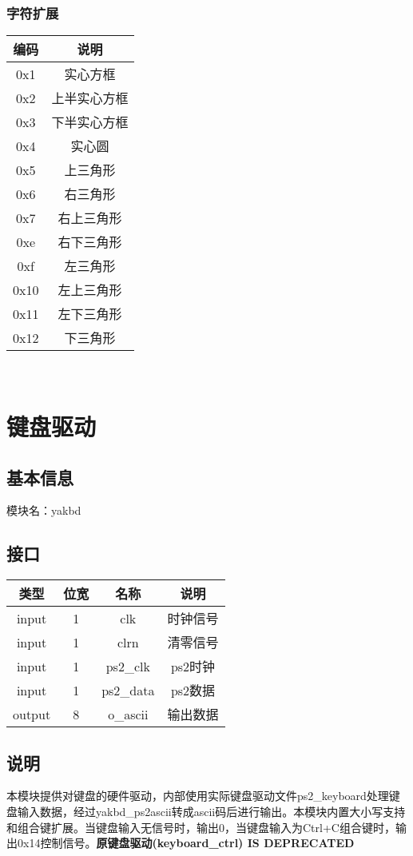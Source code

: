 \subsubsection{字符扩展}
\begin{tabular}{|c|c|}
    \hline
    编码 & 说明\\\hline
    0x1	&实心方框\\\hline
    0x2	&上半实心方框\\\hline
    0x3	&下半实心方框\\\hline
    0x4	&实心圆\\\hline
    0x5	&上三角形\\\hline
    0x6	&右三角形\\\hline
    0x7	&右上三角形\\\hline
    0xe	&右下三角形\\\hline
    0xf	&左三角形\\\hline
    0x10&	左上三角形\\\hline
    0x11&	左下三角形\\\hline
    0x12&	下三角形\\\hline
\end{tabular}\\
\section{键盘驱动}
\subsection{基本信息}
模块名：yakbd
\subsection{接口}
\begin{tabular}{|c|c|c|c|}
    \hline
    类型    &   位宽    &   名称    &   说明\\\hline
    input & 1 &clk & 时钟信号\\\hline
	input & 1 &clrn & 清零信号\\\hline
	input & 1 &ps2\_clk &ps2时钟\\\hline
	input & 1 &ps2\_data &ps2数据\\\hline
    output & 8 &o\_ascii &输出数据\\\hline
\end{tabular}
\subsection{说明}
本模块提供对键盘的硬件驱动，内部使用实际键盘驱动文件ps2\_keyboard处理键盘输入数据，经过yakbd\_ps2ascii转成ascii码后进行输出。本模块内置大小写支持和组合键扩展。当键盘输入无信号时，输出0，当键盘输入为Ctrl+C组合键时，输出0x14控制信号。\textbf{原键盘驱动(keyboard\_ctrl) IS DEPRECATED}